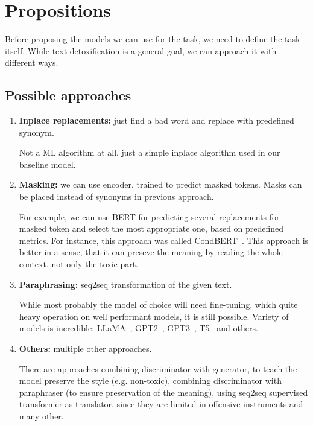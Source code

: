 \section{Propositions}

Before proposing the models we can use for the task, we need to define the task
itself. While text detoxification is a general goal, we can approach it with
different ways.

\subsection{Possible approaches}

\begin{enumerate}
    \item \textbf{Inplace replacements:} just find a bad word and replace with predefined synonym.

          Not a ML algorithm at all, just a simple inplace algorithm used in our baseline
          model.
    \item \textbf{Masking:} we can use encoder, trained to predict masked tokens. Masks can be placed instead of synonyms in previous approach.

          For example, we can use BERT for predicting several replacements for masked
          token and select the most appropriate one, based on predefined metrics. For
          instance, this approach was called CondBERT~\cite{}. This approach is better in
          a sense, that it can preseve the meaning by reading the whole context, not only
          the toxic part.

    \item \textbf{Paraphrasing:} seq2seq transformation of the given text.

          While most probably the model of choice will need fine-tuning, which quite
          heavy operation on well performant models, it is still possible. Variety of
          models is incredible: LLaMA~\cite{}, GPT2~\cite{}, GPT3~\cite{}, T5~\cite{} and
          others.

    \item \textbf{Others:} multiple other approaches.

          There are approaches combining discriminator with generator, to teach the model
          preserve the style (e.g. non-toxic), combining discriminator with paraphraser
          (to ensure preservation of the meaning), using seq2seq supervised transformer
          as translator, since they are limited in offensive instruments and many other.

\end{enumerate}

